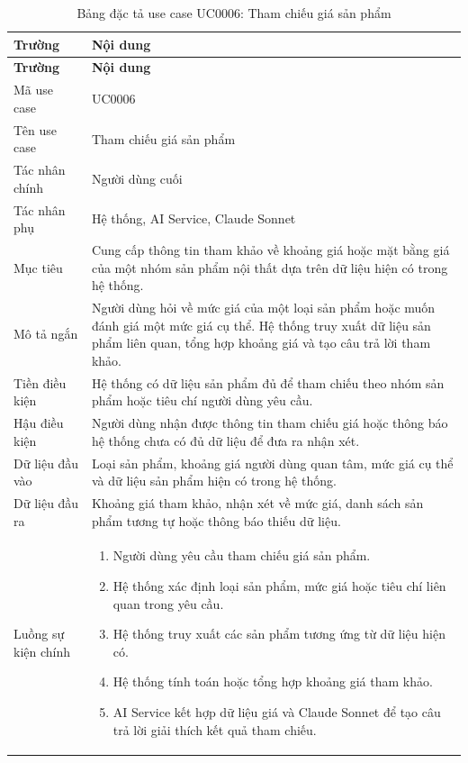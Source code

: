 \documentclass[../DoAn.tex]{subfiles}
\begin{document}
\begin{longtable}{|p{}|p{}|}
\caption{Bảng đặc tả use case UC0006: Tham chiếu giá sản phẩm}
\label{table:UC0006} \\
\hline
\textbf{Trường} & \textbf{Nội dung} \\
\hline
\endfirsthead

\hline
\textbf{Trường} & \textbf{Nội dung} \\
\hline
\endhead

Mã use case & UC0006 \\
\hline
Tên use case & Tham chiếu giá sản phẩm \\
\hline
Tác nhân chính & Người dùng cuối \\
\hline
Tác nhân phụ & Hệ thống, AI Service, Claude Sonnet \\
\hline
Mục tiêu & Cung cấp thông tin tham khảo về khoảng giá hoặc mặt bằng giá của một nhóm sản phẩm nội thất dựa trên dữ liệu hiện có trong hệ thống. \\
\hline
Mô tả ngắn & Người dùng hỏi về mức giá của một loại sản phẩm hoặc muốn đánh giá một mức giá cụ thể. Hệ thống truy xuất dữ liệu sản phẩm liên quan, tổng hợp khoảng giá và tạo câu trả lời tham khảo. \\
\hline
Tiền điều kiện & Hệ thống có dữ liệu sản phẩm đủ để tham chiếu theo nhóm sản phẩm hoặc tiêu chí người dùng yêu cầu. \\
\hline
Hậu điều kiện & Người dùng nhận được thông tin tham chiếu giá hoặc thông báo hệ thống chưa có đủ dữ liệu để đưa ra nhận xét. \\
\hline
Dữ liệu đầu vào & Loại sản phẩm, khoảng giá người dùng quan tâm, mức giá cụ thể và dữ liệu sản phẩm hiện có trong hệ thống. \\
\hline
Dữ liệu đầu ra & Khoảng giá tham khảo, nhận xét về mức giá, danh sách sản phẩm tương tự hoặc thông báo thiếu dữ liệu. \\
\hline
Luồng sự kiện chính &
\begin{minipage}[t]{0.68\textwidth}
\begin{enumerate}
    \item Người dùng yêu cầu tham chiếu giá sản phẩm.
    \item Hệ thống xác định loại sản phẩm, mức giá hoặc tiêu chí liên quan trong yêu cầu.
    \item Hệ thống truy xuất các sản phẩm tương ứng từ dữ liệu hiện có.
    \item Hệ thống tính toán hoặc tổng hợp khoảng giá tham khảo.
    \item AI Service kết hợp dữ liệu giá và Claude Sonnet để tạo câu trả lời giải thích kết quả tham chiếu.

\end{enumerate}
\end{minipage}
\end{longtable}
\end{document}
